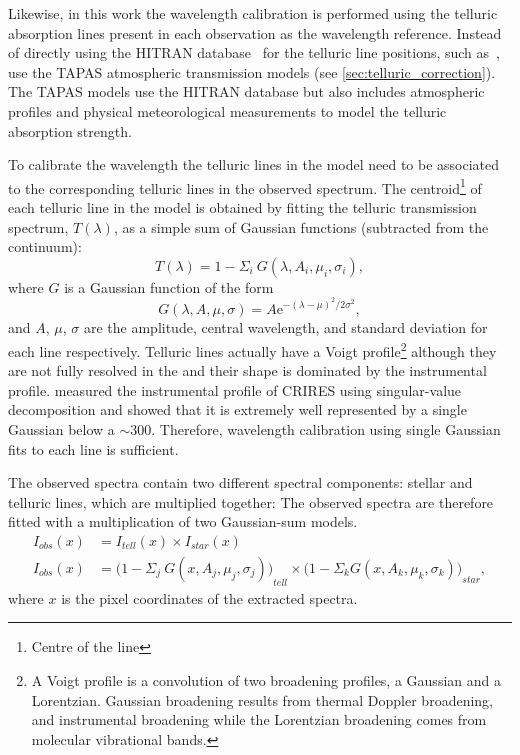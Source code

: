 Likewise, in this work the wavelength calibration is performed using the telluric absorption lines present in each observation as the wavelength reference.
Instead of directly using the {HITRAN} database~\citep{rothman_hitran2012_2013} for the telluric line positions, such as~\citet[][]{brogi_signature_2012, brogi_carbon_2014, dekok_detection_2013}, use the {TAPAS} atmospheric transmission models (see \cref{sec:telluric_correction}).
The {TAPAS} models use the {HITRAN} database but also includes atmospheric profiles and physical meteorological measurements to model the telluric absorption strength.

To calibrate the wavelength the telluric lines in the model need to be associated to the corresponding telluric lines in the observed spectrum.
The centroid\footnote{Centre of the line} of each telluric line in the model is obtained by fitting the telluric transmission spectrum, \(T(\lambda)\), as a simple sum of Gaussian functions (subtracted from the continuum):
\begin{equation}
T(\lambda) = 1 - {\Sigma}_{i}\ G(\lambda, A_{i}, {\mu}_{i}, {\sigma}_{i}),
\end{equation}
where \(G\) is a Gaussian function of the form
\begin{equation}
G(\lambda, A, \mu, \sigma) = {A \textrm{e}}^{{-(\lambda-\mu)}^{2}/2\sigma^{2}},
\end{equation}
and \(A\), \(\mu\), \(\sigma\) are the amplitude, central wavelength, and standard deviation for each line respectively.
Telluric lines actually have a Voigt profile\footnote{A Voigt profile is a convolution of two broadening profiles, a Gaussian and a Lorentzian.
Gaussian broadening results from thermal Doppler broadening, and instrumental broadening while the Lorentzian broadening comes from molecular vibrational bands\citep{meier_art_2005}.} although they are not fully resolved in the \nir{} and their shape is dominated by the instrumental profile.
\citet{seifahrt_synthesising_2010} measured the instrumental profile of {CRIRES} using singular-value decomposition and showed that it is extremely well represented by a single Gaussian below a \snr{}$\sim$300.
Therefore, wavelength calibration using single Gaussian fits to each line is sufficient.

The observed spectra contain two different spectral components: stellar and telluric lines, which are multiplied together: The observed spectra are therefore fitted with a multiplication of two Gaussian-sum models.
\begin{align}
I_{obs}(x) &= {I}_{tell}(x) \times {I}_{star}(x) \nonumber\\
I_{obs}(x) &= {\Big(1 - {\Sigma}_{j}\ G(x, A_{j}, {\mu}_{j}, {\sigma}_{j})\Big)}_{tell} \times {\Big(1 - {\Sigma}_{k} G(x, A_{k}, {\mu}_{k}, {\sigma}_{k})\Big)}_{star}, \label{eqn:obs}
\end{align}
where \(x\) is the pixel coordinates of the extracted spectra.


